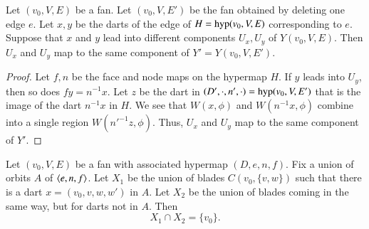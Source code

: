 \begin{lemma} 
Let $(v_0,V,E)$ be a fan.  Let $(v_0,V,E')$
be the fan obtained by deleting one edge $e$.
Let $x,y$ be the darts of the edge of
$H={\operatorname{hyp}}(v_0,V,E)$ corresponding
to $e$.  
Suppose that $x$ and $y$ lead into different components $U_x,U_y$
of $Y(v_0,V,E)$.
Then $U_x$ and $U_y$ map to the same component of $Y'=Y(v_0,V,E')$.
\end{lemma}

\begin{proof}
Let $f,n$ be the face and node maps on the hypermap
$H$.
If $y$ leads into $U_y$, then so does
$f y = n^{-1} x$.  Let $z$ be the dart in
$(D',\cdot,n',\cdot)={\operatorname{hyp}}(v_0,V,E')$ that is the image of the dart $n^{-1}x$
in $H$. We see that
$W(x,\phi)$ and $W(n^{-1} x,\phi)$ combine into a single
region $W({n'}^{-1}z,\phi)$.  Thus, $U_x$ and $U_y$ map to the
same component of $Y'$.
\end{proof}

%


%

\begin{lemma}  
Let $(v_0,V,E)$ be a fan with associated hypermap 
$(D,e,n,f)$.
Fix a union of orbits $A$ 
of $\langle e,n,f\rangle$.  Let $X_1$ be
the union of blades $C(v_0,{\{v,w\}})$ such that there is a dart 
$x =
(v_0,v,w,w')$ in $A$.  Let $X_2$ be the union of blades coming in the
same way, but for darts not in $A$.  
Then $$X_1\cap X_2 = \{v_0\}.$$
\end{lemma}

